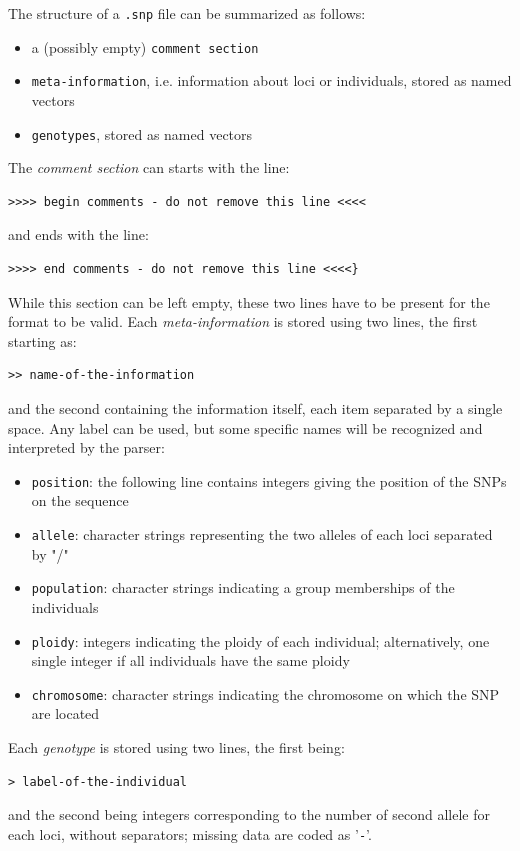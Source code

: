 \documentclass{article}
\begin{document}
The structure of a \texttt{.snp} file can be summarized as follows:
\begin{itemize}
\item a (possibly empty) \texttt{comment section}
\item \texttt{meta-information}, i.e. information about loci or individuals, stored as named vectors
\item \texttt{genotypes}, stored as named vectors
\end{itemize}

The \textit{comment section} can starts with the line:\\
\begin{verbatim}
>>>> begin comments - do not remove this line <<<<
\end{verbatim}
\noindent and ends with the line:\\
\begin{verbatim}
>>>> end comments - do not remove this line <<<<}
\end{verbatim}
\noindent While this section can be left empty, these two lines have to be present for the format to
be valid.
Each \textit{meta-information} is stored using two lines, the first starting as:
\begin{verbatim}
>> name-of-the-information
\end{verbatim}
and the second containing the information itself, each item separated by a single space.
Any label can be used, but some specific names will be recognized and interpreted by the parser:
\begin{itemize}
\item \texttt{position}: the following line contains integers giving the position of the SNPs on the sequence
\item \texttt{allele}: character strings representing the two alleles of each loci separated by "/"
\item \texttt{population}: character strings indicating a group memberships of the individuals
\item \texttt{ploidy}: integers indicating the ploidy of each individual; alternatively, one single integer if
all individuals have the same ploidy
\item \texttt{chromosome}: character strings indicating the chromosome on which the SNP are located
\end{itemize}
Each \textit{genotype} is stored using two lines, the first being:
\begin{verbatim}
> label-of-the-individual
\end{verbatim}
and the second being integers corresponding to the number of
second allele for each loci, without separators; missing data are coded as '\texttt{-}'.
\\
\end{document}
